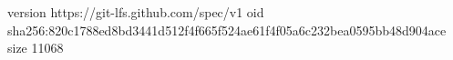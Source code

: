 version https://git-lfs.github.com/spec/v1
oid sha256:820c1788ed8bd3441d512f4f665f524ae61f4f05a6c232bea0595bb48d904ace
size 11068

